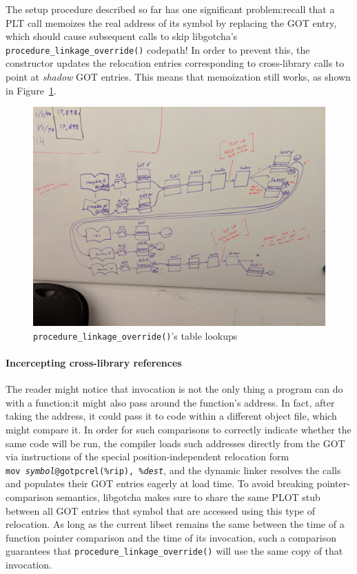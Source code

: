 The setup procedure described so far has one significant problem:\@ recall that a PLT
call memoizes the real address of its symbol by replacing the GOT entry, which should
cause subsequent calls to skip libgotcha's \texttt{procedure\_linkage\_override()}
codepath!  In order to prevent this, the constructor updates the relocation entries
corresponding to cross-library calls to point at \textit{shadow} GOT entries.  This
means that memoization still works, as shown in Figure~\ref{fig:override}.

\begin{figure}
\includegraphics[width=\columnwidth]{figs/tables}
\caption{\texttt{procedure\_linkage\_override()}'s table lookups}
\label{fig:override}
\end{figure}

\paragraph{Incercepting cross-library references}

The reader might notice that invocation is not the only thing a program can do with a
function:\@ it might also pass around the function's address.  In fact, after taking
the address, it could pass it to code within a different object file, which might
compare it.  In order for such comparisons to correctly indicate whether the same
code will be run, the compiler loads such addresses directly from the GOT via
instructions of the special position-independent relocation form
\texttt{mov~\textit{symbol}@gotpcrel(\%rip),~\%\textit{dest}}, and the dynamic linker
resolves the calls and populates their GOT entries eagerly at load time.  To avoid
breaking pointer-comparison semantics, libgotcha makes sure to share the same PLOT
stub between all GOT entries that symbol that are accessed using this type of
relocation.  As long as the current libset remains the same between the time of a
function pointer comparison and the time of its invocation, such a comparison
guarantees that \texttt{procedure\_linkage\_override()} will use the same copy of
that invocation.

